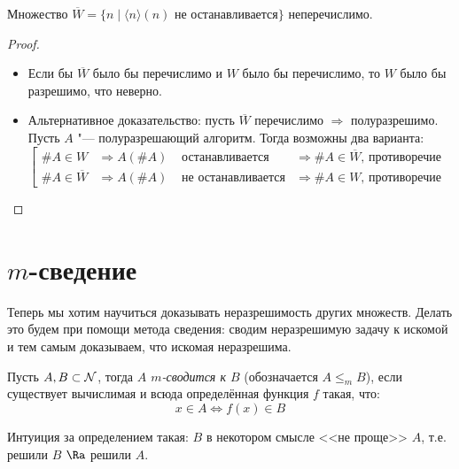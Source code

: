 \begin{conseq}
	 Множество $\overline{W} = \{n \mid \langle n\rangle(n)\text{~не останавливается}\}$ неперечислимо.
\end{conseq}
\begin{proof}
	\begin{itemize}
		\item
			Если бы $\overline{W}$ было бы перечислимо и $W$ было бы перечислимо, то $W$ было бы разрешимо, что неверно.
		\item
			Альтернативное доказательство: пусть $\overline{W}$ перечислимо $\Rightarrow$ полуразрешимо.
			Пусть $A$ "--- полуразрешающий алгоритм.
			Тогда возможны два варианта:
			$\left[
				\begin{alignedat}{2}
				\#A \in W            &\Rightarrow A(\#A) &\text{~останавливается}    &\Rightarrow \#A \in \overline{W}\text{, противоречие} \\
				\#A \in \overline{W} &\Rightarrow A(\#A) &\text{~не останавливается} &\Rightarrow \#A \in W           \text{, противоречие}
				\end{alignedat}
			\right.$
	\end{itemize}
\end{proof}

\section{$m$-сведение}
Теперь мы хотим научиться доказывать неразрешимость других множеств.
Делать это будем при помощи метода сведения: сводим неразрешимую задачу к искомой и тем самым доказываем, что искомая неразрешима.

\begin{Def}
	Пусть $A, B \subset \mathcal{N}$, тогда \textit{$A$ $m$-сводится к $B$} (обозначается $A \le_m B$),
	если существует вычислимая и всюда определённая функция $f$ такая, что:
	\[ x \in A \iff f(x) \in B \]
\end{Def}
\begin{Rem}
	Интуиция за определением такая: $B$ в некотором смысле <<не проще>> $A$, т.е. решили $B$ $\Ra$ решили $A$.
\end{Rem}

